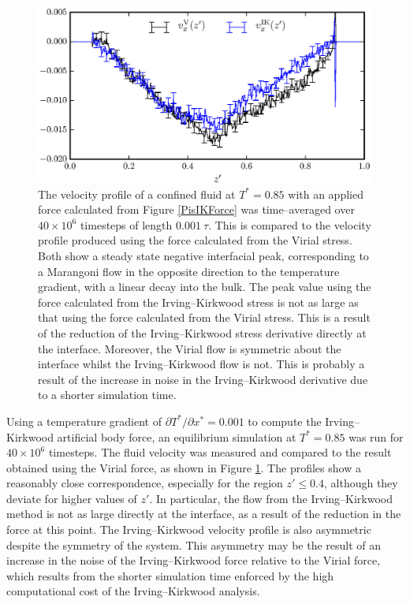 \begin{figure}[h!]
\centering
\includegraphics[scale=1.0]{PisIKFlow}
\caption{The velocity profile of a confined fluid at $T^{*}=0.85$ with an applied force calculated from Figure \ref{PisIKForce} was time--averaged over $40 \times 10^{6}$ timesteps of length $0.001\ \tau$.
This is compared to the velocity profile produced using the force calculated from the Virial stress.
Both show a steady state negative interfacial peak, corresponding to a Marangoni flow in the opposite direction to the temperature gradient, with a linear decay into the bulk.
The peak value using the force calculated from the Irving--Kirkwood stress is not as large as that using the force calculated from the Virial stress.
This is a result of the reduction of the Irving--Kirkwood stress derivative directly at the interface.
Moreover, the Virial flow is symmetric about the interface whilst the Irving--Kirkwood flow is not. 
This is probably a result of the increase in noise in the Irving--Kirkwood derivative due to a shorter simulation time.}
\label{PisIKFlow}
\end{figure}
Using a temperature gradient of $\partial T^{*} / \partial x^{*} = 0.001$ to compute the Irving--Kirkwood artificial body force, an equilibrium simulation at $T^{*} = 0.85$ was run for $40 \times 10^{6}$ timesteps.
The fluid velocity was measured and compared to the result obtained using the Virial force, as shown in Figure \ref{PisIKFlow}.
The profiles show a reasonably close correspondence, especially for the region $z' \leq 0.4$, although they deviate for higher values of $z'$.
In particular, the flow from the Irving--Kirkwood method is not as large directly at the interface, as a result of the reduction in the force at this point.
The Irving--Kirkwood velocity profile is also asymmetric despite the symmetry of the system.
This asymmetry may be the result of an increase in the noise of the Irving--Kirkwood force relative to the Virial force, which results from the shorter simulation time enforced by the high computational cost of the Irving--Kirkwood analysis.

